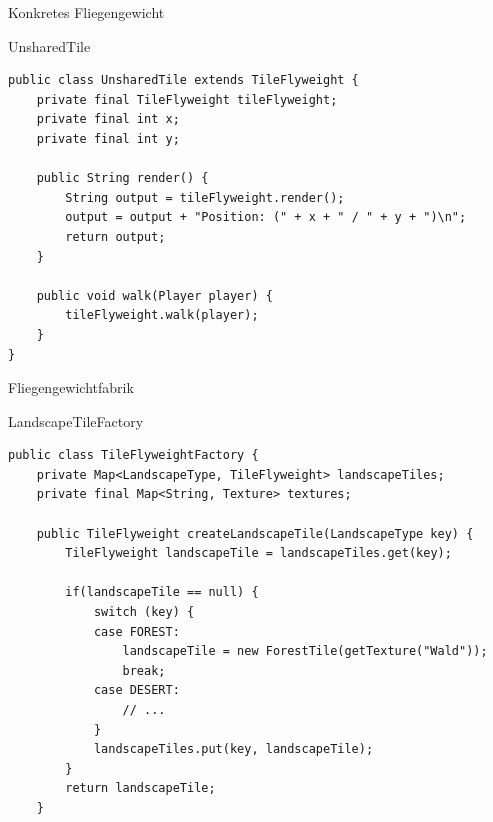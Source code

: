 \begin{frame}[fragile]{Konkretes Fliegengewicht}
	\begin{exampleblock}{UnsharedTile}
 		\begin{lstlisting}
public class UnsharedTile extends TileFlyweight {
    private final TileFlyweight tileFlyweight;
    private final int x;
    private final int y;

    public String render() {
        String output = tileFlyweight.render();
        output = output + "Position: (" + x + " / " + y + ")\n";
        return output;
    }

	public void walk(Player player) {
		tileFlyweight.walk(player);
	}
}
 		\end{lstlisting}
 	\end{exampleblock}
\end{frame}

\begin{frame}[fragile]{Fliegengewichtfabrik}
	\begin{exampleblock}{LandscapeTileFactory}
 		\begin{lstlisting}
public class TileFlyweightFactory {
	private Map<LandscapeType, TileFlyweight> landscapeTiles;
	private final Map<String, Texture> textures;
	
	public TileFlyweight createLandscapeTile(LandscapeType key) {
		TileFlyweight landscapeTile = landscapeTiles.get(key);
		
		if(landscapeTile == null) {
			switch (key) {
			case FOREST:
				landscapeTile = new ForestTile(getTexture("Wald"));
				break;
			case DESERT:
				// ...
			}
			landscapeTiles.put(key, landscapeTile);
		}
		return landscapeTile;
	}
        \end{lstlisting}
 	\end{exampleblock}
\end{frame}

